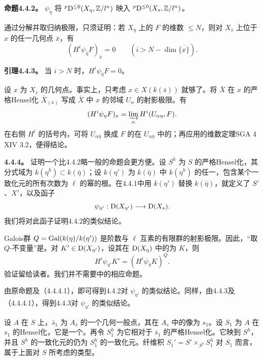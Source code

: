 \par\medskip\noindent\textbf{命题4.4.2。} $\psi_{\bar\eta}$ 将 ${}^p\D^{\le0}(X_{\bar\eta},\Z/\ell^n)$ 映入 ${}^p\D^{\le0}(X_{\bar s},\Z/\ell^n)$。

通过分解并取归纳极限，只须证明：若 $X_{\bar\eta}$ 上的 $F$ 的维数 $\le N$，则对 $X_{\bar s}$ 上位于 $x$ 的任一几何点 $\bar x$，有
\[(H^i\psi_{\bar\eta}F)_{\bar x}=0\qquad(i>N-\dim\overline{\{x\}}).\]

\par\medskip\noindent\textbf{引理4.4.3。} 当 $i>N$ 时，$H^i\psi_{\bar\eta}F=0$。

设 $x$ 为 $X_{\bar s}$ 的几何点。事实上，只考虑 $x\in X(k(\bar s))$ 就够了。将 $\bar X$ 在 $x$ 的严格Hensel化 $\bar X_{(x)}$ 写成 $\bar X$ 中 $x$ 的邻域 $U_\alpha$ 的射影极限。有
\[(H^i\psi_{\bar\eta}F)_x=\varinjlim_\alpha H^i(U_{\alpha\bar\eta},F).\]
在右侧 $H^i$ 的括号内，可将 $U_{\alpha\bar\eta}$ 换成 $F$ 的在 $U_{\alpha\bar\eta}$ 中的；再应用的维数定理SGA 4 XIV 3.2，便得结论。

\par\medskip\noindent\textbf{4.4.4。} 证明一个比4.4.2略一般的命题会更方便。设 $S^h$ 为 $S$ 的严格Hensel化，其分式域为 $k(\eta^h)\subset k(\bar\eta)$；设 $k(\eta')$ 为 $k(\bar\eta)$ 中 $k(\eta^h)$ 的任一，包含某个一致化元的所有次数为 $\ell$ 的幂的根。在4.4.1中用 $k(\eta')$ 替换 $k(\bar\eta)$，就定义了 $S'$、$X'$，以及函子
\[\psi_{\eta'}:\D(X_{\eta'})\longrightarrow\D(X_{\bar s}).\]
我们将对此函子证明4.4.2的类似结论。

Galois群 $Q=\Gal(k(\bar\eta)/k(\eta'))$ 是阶数与 $\ell$ 互素的有限群的射影极限。因此，“取 $Q$-不变量”是。对 $K'\in\D(X_{\eta'})$，设其在 $\D(X_{\bar\eta})$ 中的为 $K$，则
\begin{equation*}H^i\psi_{\eta'}K'=(H^i\psi_{\bar\eta}K)^Q.\tag{4.4.4.1}\end{equation*}
验证留给读者。我们并不需要中的相应命题。

由原命题及（4.4.4.1），即可得到4.4.2对 $\psi_{\eta'}$ 的类似结论。同样，由4.4.3及（4.4.4.1），得到4.4.3对 $\psi_{\eta'}$ 的类似结论。

设 $A$ 在 $S$ 上，$\bar s_1$ 为 $A_{\bar s}$ 的一个几何一般点，其在 $A_s$ 中的像为 $s_1$。设 $S_1$ 为 $A$ 在 $s_1$ 的Hensel化，它是一个。再令 $S_1^h$ 为它相对于 $\bar s_1$ 的严格Hensel化。它映到 $S^h$，并且 $S^h$ 的一致化元的仍为 $S_1^h$ 的一致化元。纤维积 $S_1'=S'\times_{S^h}S_1^h$ 对 $S_1$ 而言，属于上面对 $S$ 所考虑的类型。

